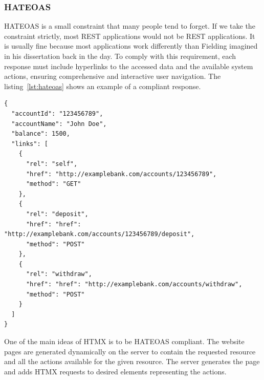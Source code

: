 \subsubsection{HATEOAS}

HATEOAS is a small constraint that many people tend to forget. If we take the constraint strictly, most REST applications would not be REST applications. It is usually fine because most applications work differently than Fielding imagined in his dissertation back in the day. To comply with this requirement, each response must include hyperlinks to the accessed data and the available system actions, ensuring comprehensive and interactive user navigation. The listing~\ref{lst:hateoas} shows an example of a compliant response.

\begin{lstlisting}[caption=An HATEOAS response in JSON format,label=lst:hateoas, H]
{
  "accountId": "123456789",
  "accountName": "John Doe",
  "balance": 1500,
  "links": [
    {
      "rel": "self",
      "href": "http://examplebank.com/accounts/123456789",
      "method": "GET"
    },
    {
      "rel": "deposit",
      "href": "href": "http://examplebank.com/accounts/123456789/deposit",
      "method": "POST"
    },
    {
      "rel": "withdraw",
      "href": "href": "http://examplebank.com/accounts/withdraw",
      "method": "POST"
    }
  ]
}
\end{lstlisting}

One of the main ideas of HTMX is to be HATEOAS compliant. The website pages are generated dynamically on the server to contain the requested resource and all the actions available for the given resource. The server generates the page and adds HTMX requests to desired elements representing the actions.